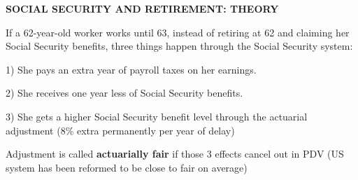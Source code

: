\documentclass[landscape]{slides}
\begin{document}
\begin{slide}

\end{slide}



%
%
%
%
%
%
%



\begin{slide}
\begin{center}
{\bf SOCIAL SECURITY AND RETIREMENT: THEORY}
\end{center}

If a 62-year-old worker works until 63, instead of retiring at 62 and claiming her Social Security benefits, three things happen through the Social Security system:

1) She pays an extra year of payroll taxes on her earnings.

2) She receives one year less of Social Security benefits.

3) She gets a higher Social Security benefit level through the actuarial adjustment (8\% extra permanently per year of delay)

Adjustment is called {\bf actuarially fair} if those 3 effects cancel out in PDV (US system has been reformed to be close to fair on average)
\end{slide}
\end{document}
